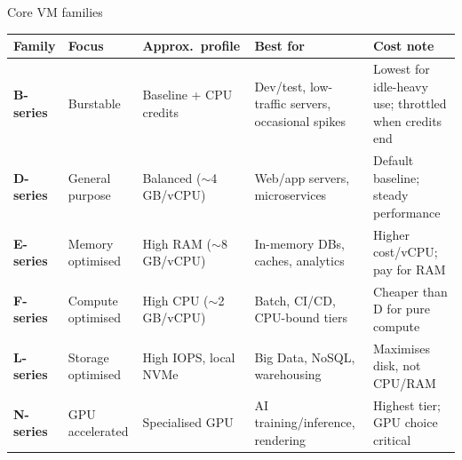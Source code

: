 \documentclass[aspectratio=169,xcolor=dvipsnames]{beamer}
\begin{document}
	\begin{frame}[shrink=10]{Core VM families}
		\centering
		\renewcommand{\arraystretch}{1.4}
		\setlength{\tabcolsep}{4pt}
		\small
		
		\begin{tabular}{@{} L{1.6cm} L{2.2cm} L{2.6cm} L{3.8cm} L{3.2cm} @{}}
			\toprule
			\textbf{Family} & \textbf{Focus} & \textbf{Approx.\ profile} & \textbf{Best for} & \textbf{Cost note} \\
			\midrule
			\textbf{B-series} & Burstable
			& Baseline + CPU credits
			& Dev/test, low-traffic servers, occasional spikes
			& Lowest for idle-heavy use; throttled when credits end \\
			\addlinespace
			\textbf{D-series} & General purpose
			& Balanced ($\sim$4\,GB/vCPU)
			& Web/app servers, microservices
			& Default baseline; steady performance \\
			\addlinespace
			\textbf{E-series} & Memory optimised
			& High RAM ($\sim$8\,GB/vCPU)
			& In-memory DBs, caches, analytics
			& Higher cost/vCPU; pay for RAM \\
			\addlinespace
			\textbf{F-series} & Compute optimised
			& High CPU ($\sim$2\,GB/vCPU)
			& Batch, CI/CD, CPU-bound tiers
			& Cheaper than D for pure compute \\
			\addlinespace
			\textbf{L-series} & Storage optimised
			& High IOPS, local NVMe
			& Big Data, NoSQL, warehousing
			& Maximises disk, not CPU/RAM \\
			\addlinespace
			\textbf{N-series} & GPU accelerated
			& Specialised GPU
			& AI training/inference, rendering
			& Highest tier; GPU choice critical \\
			\bottomrule
		\end{tabular}
	\end{frame}
\end{document}
